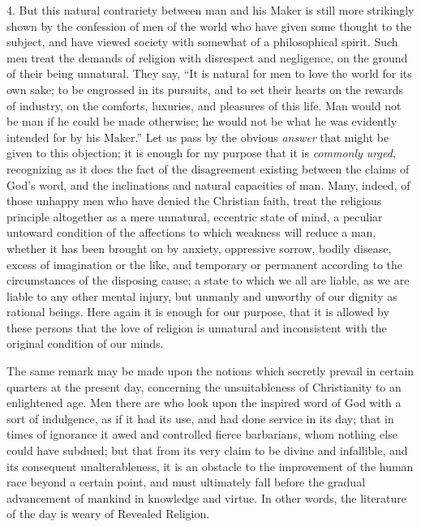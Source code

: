 4. But this natural contrariety between man and his Maker is still
more strikingly shown by the confession of men of the world who have
given some thought to the subject, and have viewed society with
somewhat of a philosophical spirit. Such men treat the demands of
religion with disrespect and negligence, on the ground of their being
unnatural. They say, ``It is natural for men to love the world for
its own sake; to be engrossed in its pursuits, and to set their hearts
on the rewards of industry, on the comforts, luxuries, and pleasures
of this life. Man would not be man if he could be made otherwise; he
would not be what he was evidently intended for by his Maker.''
Let us pass by the obvious \emph{answer} that might be given to this
objection; it is enough for my purpose that it is \emph{commonly urged},
recognizing as it does the fact of the disagreement existing between
the claims of God's word, and the inclinations and natural capacities
of man. Many, indeed, of those unhappy men who have denied the
Christian faith, treat the religious principle altogether as a mere
unnatural, eccentric state of mind, a peculiar untoward condition of
the affections to which weakness will reduce a man, whether it has
been brought on by anxiety, oppressive sorrow, bodily disease, excess
of imagination or the like, and temporary or permanent according to
the circumstances of the disposing cause; a state to which we all are
liable, as we are liable to any other mental injury, but unmanly and
unworthy of our dignity as rational beings. Here again it is enough
for our purpose, that it is allowed by these persons that the love of
religion is unnatural and inconsistent with the original condition of
our minds.

The same remark may be made upon the notions which secretly prevail
in certain quarters at the present day, concerning the unsuitableness
of Christianity to an enlightened age. Men there are who look upon the
inspired word of God with a sort of indulgence, as if it had its use,
and had done service in its day; that in times of ignorance it awed
and controlled fierce barbarians, whom nothing else could have
subdued; but that from its very claim to be divine and infallible, and
its consequent unalterableness, it is an obstacle to the improvement
of the human race beyond a certain point, and must ultimately fall
before the gradual advancement of mankind in knowledge and virtue. In
other words, the literature of the day is weary of Revealed Religion.

